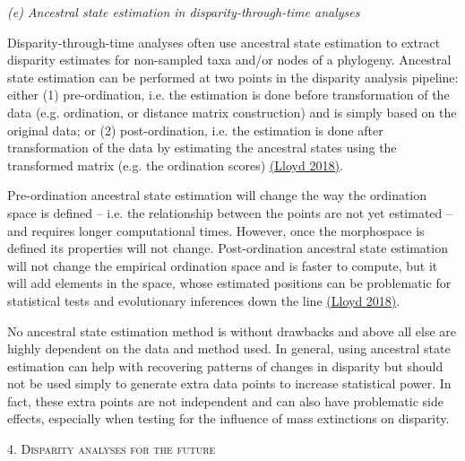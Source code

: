 \documentclass[12pt,letterpaper]{article}
\renewcommand{\section}[1]{%
\bigskip
\begin{center}
\begin{Large}
\normalfont\scshape #1
\medskip
\end{Large}
\end{center}}
\renewcommand{\subsection}[1]{%
\bigskip
\begin{center}
\begin{large}
\normalfont\itshape #1
\end{large}
\end{center}}
\begin{document}
\hypertarget{e-ancestral-state-estimation-in-disparity-through-time-analyses}{%
\subsection{(e) Ancestral state estimation in disparity-through-time
analyses}\label{e-ancestral-state-estimation-in-disparity-through-time-analyses}}

Disparity-through-time analyses often use ancestral state estimation to extract disparity estimates for non-sampled taxa and/or nodes of a phylogeny.
Ancestral state estimation can be performed at two points in the disparity analysis pipeline: either (1) pre-ordination, i.e. the estimation is done before transformation of the data (e.g. ordination, or distance matrix construction) and is simply based on the original data; or (2) post-ordination, i.e. the estimation is done after transformation of the data by estimating the ancestral states using the transformed matrix (e.g. the ordination scores) \href{https://paperpile.com/c/sTGYvp/53SJ}{(Lloyd 2018)}.

Pre-ordination ancestral state estimation will change the way the ordination space is defined -- i.e. the relationship between the points are not yet estimated -- and requires longer computational times.
However, once the morphospace is defined its properties will not change.
Post-ordination ancestral state estimation will not change the empirical ordination space and is faster to compute, but it will add elements in the space, whose estimated positions can be problematic for statistical tests and evolutionary inferences down the line \href{https://paperpile.com/c/sTGYvp/53SJ}{(Lloyd 2018)}.

No ancestral state estimation method is without drawbacks
 and above all else are highly dependent on the data and method used.
In general, using ancestral state estimation can help with recovering patterns of changes in disparity but should not be used simply to generate extra data points to increase statistical power.
In fact, these extra points are not independent and can also have problematic side effects, especially when testing for the influence of mass extinctions on disparity.

\hypertarget{disparity-analyses-for-the-future}{%
\section{4. Disparity analyses for the
future}\label{disparity-analyses-for-the-future}}
\end{document}
